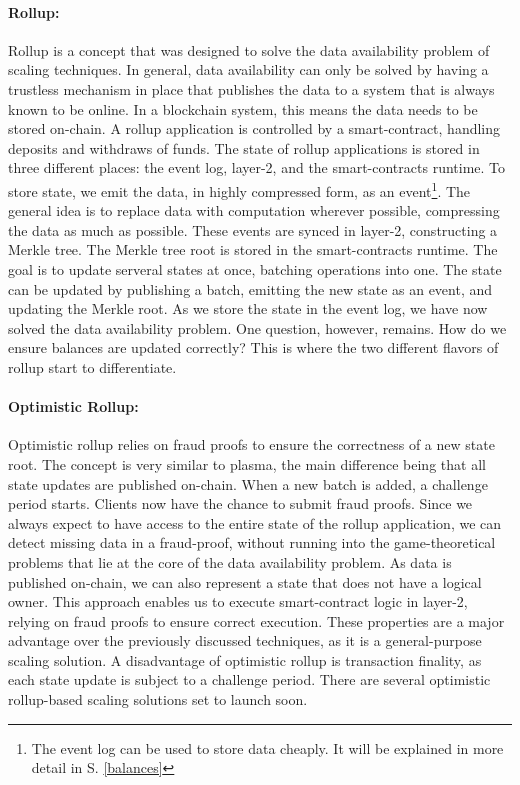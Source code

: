 \documentclass[../../thesis.tex]{subfiles}
\begin{document}
\paragraph{Rollup:}
Rollup is a concept that was designed to solve the data availability problem of scaling techniques. In general, data availability can only be solved by having a trustless mechanism in place that publishes the data to a system that is always known to be online. In a blockchain system, this means the data needs to be stored on-chain. A rollup application is controlled by a smart-contract, handling deposits and withdraws of funds. The state of rollup applications is stored in three different places: the event log, layer-2, and the smart-contracts runtime. To store state, we emit the data, in highly compressed form, as an event\footnote{The event log can be used to store data cheaply. It will be explained in more detail in S. \ref{balances}}. The general idea is to replace data with computation wherever possible, compressing the data as much as possible. These events are synced in layer-2, constructing a Merkle tree. The Merkle tree root is stored in the smart-contracts runtime. The goal is to update serveral states at once, batching operations into one. The state can be updated by publishing a batch, emitting the new state as an event, and updating the Merkle root. As we store the state in the event log, we have now solved the data availability problem. One question, however, remains. How do we ensure balances are updated correctly? This is where the two different flavors of rollup start to differentiate.

\paragraph{Optimistic Rollup:}
Optimistic rollup relies on fraud proofs to ensure the correctness of a new state root. The concept is very similar to plasma, the main difference being that all state updates are published on-chain. When a new batch is added, a challenge period starts. Clients now have the chance to submit fraud proofs. Since we always expect to have access to the entire state of the rollup application, we can detect missing data in a fraud-proof, without running into the game-theoretical problems that lie at the core of the data availability problem. As data is published on-chain, we can also represent a state that does not have a logical owner. This approach enables us to execute smart-contract logic in layer-2, relying on fraud proofs to ensure correct execution. These properties are a major advantage over the previously discussed techniques, as it is a general-purpose scaling solution. A disadvantage of optimistic rollup is transaction finality, as each state update is subject to a challenge period. There are several optimistic rollup-based scaling solutions set to launch soon. 
\end{document}
